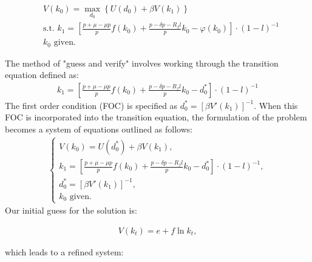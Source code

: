 \documentclass[12pt]{report}
\begin{document}
 \begin{align}
     & V(k_0) = \max_{d_0} \left\{U(d_0) + \beta V(k_1)\right\} \\
     & \text{s.t. } k_1 = \left[ \frac{p + \mu - \mu p}{p}f(k_{0}) + \frac{p - \delta p - R_f l}{p} k_{0}  - \varphi(k_{0}) \right] \cdot \left(1-l\right)^{-1} \nonumber  \\
     & k_0 \text{ given.} \nonumber
 \end{align}

 The method of "guess and verify" involves working through the
 transition equation defined as:
 \begin{align*}
     k_1 = \left[ \frac{p + \mu - \mu p}{p}f(k_{0}) + \frac{p - \delta p - R_f l}{p} k_{0}  - d^*_0 \right] \cdot \left(1-l\right)^{-1}
 \end{align*}
The first order condition (FOC) is specified as \(d^*_0 = [\beta V'(k_{1})]^{-1}\). When this
 FOC is incorporated into the transition equation, the formulation of the problem becomes a system of equations outlined
 as follows:
 \begin{align*}
     \begin{cases}
         V(k_0) = U(d_0^*) + \beta V(k_1), \\
         k_1 = \left[ \frac{p + \mu - \mu p}{p}f(k_{0}) + \frac{p - \delta p - R_f l}{p} k_{0}  - d^*_0 \right] \cdot \left(1-l\right)^{-1}, \\
         d^*_0 = [\beta V'(k_{1})]^{-1},\\
         k_0 \text{ given.}
     \end{cases}
 \end{align*}
Our initial guess for the solution is:

 \begin{align*}
     V(k_t) = e + f \ln{k_t},
 \end{align*}

 which leads to a refined system:
\end{document}
